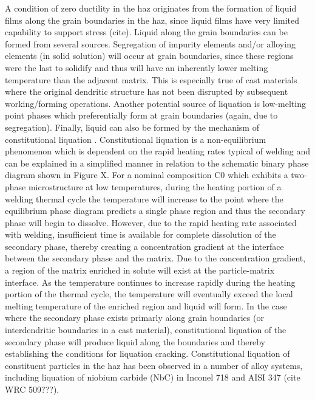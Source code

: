 A condition of zero ductility in the \gls{haz} originates from the formation of liquid films along the grain boundaries in the \gls{haz}, since liquid films have very limited capability to support stress (cite). Liquid along the grain boundaries can be formed from several sources. Segregation of impurity elements and/or alloying elements (in solid solution) will occur at grain boundaries, since these regions were the last to solidify and thus will have an inherently lower melting temperature than the adjacent matrix. This is especially true of cast materials where the original dendritic structure has not been disrupted by subsequent working/forming operations. Another potential source of liquation is low-melting point phases which preferentially form at grain boundaries (again, due to segregation). Finally, liquid can also be formed by the mechanism of constitutional liquation \citet{pepe_effects_1967}. Constitutional liquation is a non-equilibrium phenomenon which is dependent on the rapid heating rates typical of welding and can be explained in a simplified manner in relation to the schematic binary phase diagram shown in Figure X. For a nominal composition C0 which exhibits a two-phase microstructure at low temperatures, during the heating portion of a welding thermal cycle the temperature will increase to the point where the equilibrium phase diagram predicts a single phase region and thus the secondary phase will begin to dissolve. However, due to the rapid heating rate associated with welding, insufficient time is available for complete dissolution of the secondary phase, thereby creating a concentration gradient at the interface between the secondary phase and the matrix. Due to the concentration gradient, a region of the matrix enriched in solute will exist at the particle-matrix interface. As the temperature continues to increase rapidly during the heating portion of the thermal cycle, the temperature will eventually exceed the local melting temperature of the enriched region and liquid will form. In the case where the secondary phase exists primarly along grain boundaries (or interdendritic boundaries in a cast material), constitutional liquation of the secondary phase will produce liquid along the boundaries and thereby establishing the conditions for liquation cracking. Constitutional liquation of constituent particles in the \gls{haz} has been observed in a number of alloy systems, including liquation of niobium carbide (NbC) in Inconel 718 \cite{radhakrishnan_phase_1991} and AISI 347 (cite WRC 509???).

